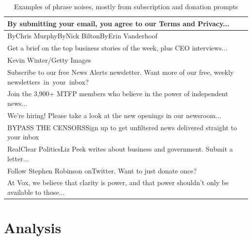 \begin{table}[htbp]
    \centering
    \scriptsize
    \begin{tabular}{| l |}
        \hline
        By submitting your email, you agree to our Terms and Privacy...                                        \\
        \hline
        ByChris MurphyByNick BiltonByErin Vanderhoof                                                           \\
        \hline
        Get a brief on the top business stories of the week, plus CEO interviews...                            \\
        \hline
        Kevin Winter/Getty Images                                                                              \\
        \hline
        Subscribe to our free News Alerts newsletter. Want more of our free, weekly newsletters in your inbox? \\
        \hline
        Join the 3,900+ MTFP members who believe in the power of independent news...                           \\
        \hline
        We're hiring! Please take a look at the new openings in our newsroom...                                \\
        \hline
        BYPASS THE CENSORSSign up to get unfiltered news delivered straight to your inbox                      \\
        \hline
        RealClear PoliticsLiz Peek writes about business and government. Submit a letter...                    \\
        \hline
        Follow Stephen Robinson onTwitter. Want to just donate once?                                           \\
        \hline
        At Vox, we believe that clarity is power, and that power shouldn’t only be available to those...       \\
        \hline
    \end{tabular}
    \caption{Examples of phrase noises, mostly from subscription and donation prompts}
    \label{table:noise_phrases}
\end{table}

\section{Analysis}


